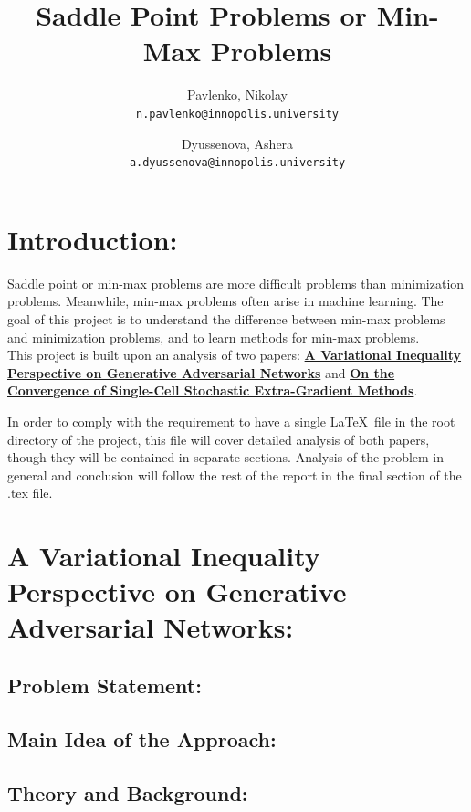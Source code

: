 \documentclass[11pt]{article}
\title{Saddle Point Problems or Min-Max Problems}
\date{}
\author{
	Pavlenko, Nikolay\\
	\texttt{n.pavlenko@innopolis.university}
	\and
	Dyussenova, Ashera\\
	\texttt{a.dyussenova@innopolis.university}
}
\begin{document}
\maketitle

\section*{Introduction:}

Saddle point or min-max problems are more difficult problems than minimization problems. Meanwhile, min-max problems often arise in machine learning. The goal of this project is to understand the difference between min-max problems and minimization problems, and to learn methods for min-max problems. \\

This project is built upon an analysis of two papers: \href{https://openreview.net/pdf?id=r1laEnA5Ym}{\textbf{A Variational Inequality Perspective on Generative Adversarial Networks}} and \href{https://proceedings.neurips.cc/paper/2019/file/4625d8e31dad7d1c4c83399a6eb62f0c-Paper.pdf}{\textbf{On the Convergence of Single-Cell Stochastic Extra-Gradient Methods}}.

In order to comply with the requirement to have a single \LaTeX\ file in the root directory of the project, this file will cover detailed analysis of both papers, though they will be contained in separate sections. Analysis of the problem in general and conclusion will follow the rest of the report in the final section of the .tex file.

\section{A Variational Inequality Perspective on Generative Adversarial Networks:}

	\subsection{Problem Statement:}
	
	\subsection{Main Idea of the Approach:}
	
	\subsection{Theory and Background:}
		
\end{document}
